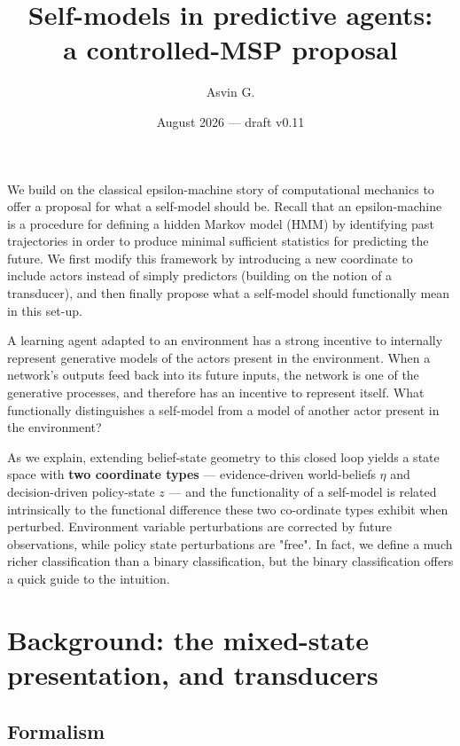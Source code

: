 \documentclass[11pt]{article}
\title{Self-models in predictive agents:\\ a controlled-MSP proposal}
\author{Asvin G.}
\date{August 2026 --- draft v0.11}
\begin{document}
\maketitle

We build on the classical epsilon-machine story of computational mechanics \citep{crutchfield1989, shalizi2001} to offer a proposal for what a self-model should be. Recall that an epsilon-machine is a procedure for defining a hidden Markov model (HMM) by identifying past trajectories in order to produce minimal sufficient statistics for predicting the future. We first modify this framework by introducing a new coordinate to include actors instead of simply predictors (building on the notion of a transducer), and then finally propose what a self-model should functionally mean in this set-up.

A learning agent adapted to an environment has a strong incentive to internally represent generative models of the actors present in the environment. When a network's outputs feed back into its future inputs, the network is one of the generative processes, and therefore has an incentive to represent itself. What functionally distinguishes a self-model from a model of another actor present in the environment?

As we explain, extending belief-state geometry \citep{shai2024, factored2026} to this closed loop yields a state space with \textbf{two coordinate types} --- evidence-driven world-beliefs $\eta$ and decision-driven policy-state $z$ --- and the functionality of a self-model is related intrinsically to the functional difference these two co-ordinate types exhibit when perturbed. Environment variable perturbations are corrected by future observations, while policy state perturbations are "free". In fact, we define a much richer classification than a binary classification, but the binary classification offers a quick guide to the intuition.


\section{Background: the mixed-state presentation, and transducers}
\label{sec:background}

\subsection*{Formalism}
\end{document}
